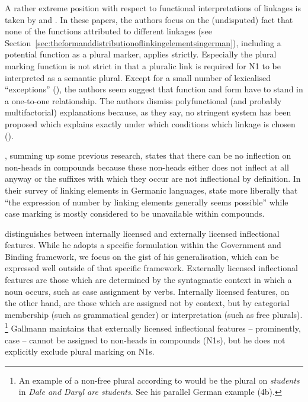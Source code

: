 A rather extreme position with respect to functional interpretations of linkages is taken by \textcite{NeefBorgwaldt2012} and \textcite{Neef2015}.
In these papers, the authors focus on the (undisputed) fact that none of the functions attributed to different linkages (see Section~\ref{sec:theformanddistributionoflinkingelementsingerman}), including a potential function as a plural marker, applies strictly.
Especially the plural marking function is not strict in that a pluralic link is required for N1 to be interpreted as a semantic plural.
Except for a small number of lexicalised ``exceptions'' (\egg \citealt[42]{NeefBorgwaldt2012}), the authors seem suggest that function and form have to stand in a one-to-one relationship.
The authors dismiss polyfunctional (and probably multifactorial) explanations because, as they say, no stringent system has been proposed which explains exactly under which conditions which linkage is chosen (\egg \citealt[27--29]{NeefBorgwaldt2012}).

\textcite[9]{Schluecker2012}, summing up some previous research, states that there can be no inflection on non-heads in compounds because these non-heads either does not inflect at all anyway or the suffixes with which they occur are not inflectional by definition.
In their survey of linking elements in Germanic languages, \textcite[577]{FuhrhopKuerschner2015} state more liberally that ``the expression of number by linking elements generally seems possible'' while case marking is mostly considered to be unavailable within compounds.

\textcite[178--180]{Gallmann1998} distinguishes between internally licensed and externally licensed inflectional features.
While he adopts a specific formulation within the Government and Binding framework, we focus on the gist of his generalisation, which can be expressed well outside of that specific framework.
Externally licensed inflectional features are those which are determined by the syntagmatic context in which a noun occurs, such as case assignment by verbs.
Internally licensed features, on the other hand, are those which are assigned not by context, but by categorial membership (such as grammatical gender) or interpretation (such as free plurals).%
\footnote{An example of a non-free plural according to \textcite[179]{Gallmann1998} would be the plural on \textit{students} in \textit{Dale and Daryl are students}.
See his parallel German example (4b).
}
Gallmann maintains that externally licensed inflectional features -- prominently, case -- cannot be assigned to non-heads in compounds (N1s), but he does not explicitly exclude plural marking on N1s.

